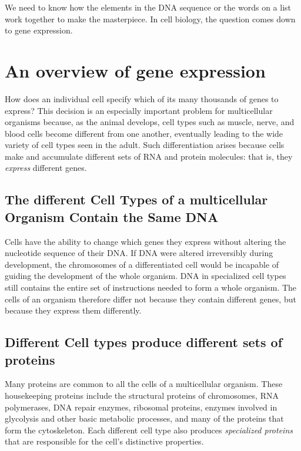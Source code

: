 We need to know how the elements in the DNA sequence or the words on a list work
together to make the masterpiece.
In cell biology, the question comes down to gene expression.

\section{An overview of gene expression}

How does an individual cell specify which of its many thousands of genes
to express? This decision is an especially important problem for multicellular
organisms because, as the animal develops, cell types such as
muscle, nerve, and blood cells become different from one another, eventually
leading to the wide variety of cell types seen in the adult. Such
differentiation arises because cells make and accumulate different sets
of RNA and protein molecules: that is, they \textit{express} different genes.

\subsection{The different Cell Types of a multicellular Organism Contain the Same DNA}

Cells have the ability to change which genes they
express without altering the nucleotide sequence of their DNA.
If DNA were altered irreversibly during development,
the chromosomes of a differentiated cell would be incapable of guiding
the development of the whole organism. DNA in specialized cell types
still contains the entire set of instructions needed to form a whole organism.
The cells of an organism therefore differ not because they contain
different genes, but because they express them differently.

\subsection{Different Cell types produce different sets of proteins}

Many proteins are common to all the cells of a multicellular organism.
These housekeeping proteins include the structural
proteins of chromosomes, RNA polymerases, DNA repair enzymes, ribosomal
proteins, enzymes involved in glycolysis and other basic metabolic
processes, and many of the proteins that form the cytoskeleton. Each different
cell type also produces \textit{specialized proteins} that are responsible for
the cell’s distinctive properties.

